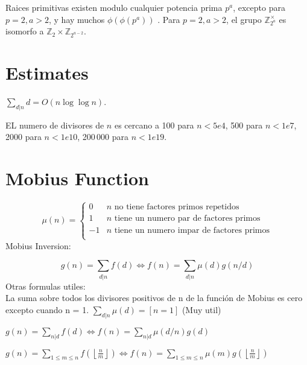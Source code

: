 	Raices primitivas existen modulo cualquier potencia prima $p^a$, excepto para $p = 2, a > 2$, y hay muchos $\phi(\phi(p^a))$ .
	Para $p = 2, a > 2$, el grupo $\mathbb Z_{2^a}^\times$ es isomorfo a $\mathbb Z_2 \times \mathbb Z_{2^{a-2}}$.

\section{Estimates}
	$\sum_{d|n} d = O(n \log \log n)$.

	EL numero de divisores de $n$ es cercano a 100 para $n < 5e4$, 500 para $n < 1e7$, 2000 para $n < 1e10$, 200\,000 para $n < 1e19$.

\section{Mobius Function}
\[
	\mu(n) = \begin{cases} 0 & n \textrm{ no tiene factores primos repetidos}\\ 1 & n \textrm{ tiene un numero par de factores primos}\\ -1 & n \textrm{ tiene un numero impar de factores primos}\\\end{cases}
\]
  Mobius Inversion:

  \[ g(n) = \sum_{d|n} f(d) \Leftrightarrow f(n) = \sum_{d|n} \mu(d)g(n/d) \]
  Otras formulas utiles:\\
    La suma sobre todos los divisores positivos de n de la función de Mobius es cero excepto cuando n = 1.
  $ \sum_{d | n} \mu(d) = [ n = 1] $ (Muy util)

  $ g(n) = \sum_{n|d} f(d) \Leftrightarrow f(n) = \sum_{n|d} \mu(d/n)g(d)$

 $ g(n) = \sum_{1 \leq m \leq n} f(\left\lfloor\frac{n}{m}\right \rfloor ) \Leftrightarrow f(n) = \sum_{1\leq m\leq n} \mu(m)g(\left\lfloor\frac{n}{m}\right\rfloor)$
